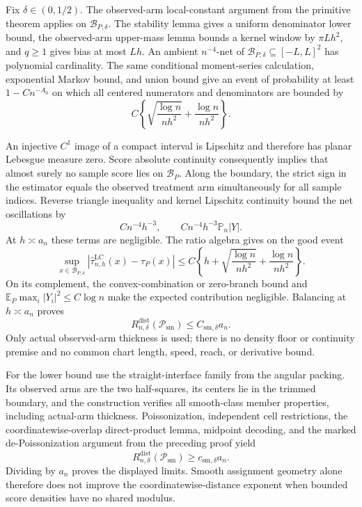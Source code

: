 Fix \(\delta\in(0,1/2)\).  The observed-arm local-constant argument from the primitive theorem applies on \(\mathcal B_{P,\delta}\).  The stability lemma gives a uniform denominator lower bound, the observed-arm upper-mass lemma bounds a kernel window by \(\pi Lh^2\), and \(q\geq1\) gives bias at most \(Lh\).  An ambient \(n^{-4}\)-net of \(\mathcal B_{P,\delta}\subseteq[-L,L]^2\) has polynomial cardinality.  The same conditional moment-series calculation, exponential Markov bound, and union bound give an event of probability at least \(1-Cn^{-A_0}\) on which all centered numerators and denominators are bounded by
\[
 C\left\{\sqrt{\frac{\log n}{nh^2}}+\frac{\log n}{nh^2}\right\}.
\]

An injective \(C^1\) image of a compact interval is Lipschitz and therefore has planar Lebesgue measure zero.  Score absolute continuity consequently implies that almost surely no sample score lies on \(\mathcal B_P\).  Along the boundary, the strict sign in the estimator equals the observed treatment arm simultaneously for all sample indices.  Reverse triangle inequality and kernel Lipschitz continuity bound the net oscillations by
\[
 Cn^{-4}h^{-3},
 \qquad Cn^{-4}h^{-3}\mathbb P_n|Y|.
\]
At \(h\asymp a_n\) these terms are negligible.  The ratio algebra gives on the good event
\[
 \sup_{x\in\mathcal B_{P,\delta}}
 |\widehat\tau^{\mathrm{LC}}_{n,h}(x)-\tau_P(x)|
 \leq C\left\{h+\sqrt{\frac{\log n}{nh^2}}+\frac{\log n}{nh^2}\right\}.
\]
On its complement, the convex-combination or zero-branch bound and \(\mathbb E_P\max_i|Y_i|^2\leq C\log n\) make the expected contribution negligible.  Balancing at \(h\asymp a_n\) proves
\[
 R_{n,\delta}^{\mathrm{dist}}(\mathcal P_{\mathrm{sm}})
 \leq C_{\mathrm{sm},\delta}a_n.
\]
Only actual observed-arm thickness is used; there is no density floor or continuity premise and no common chart length, speed, reach, or derivative bound.

For the lower bound use the straight-interface family from the angular packing.  Its observed arms are the two half-squares, its centers lie in the trimmed boundary, and the construction verifies all smooth-class member properties, including actual-arm thickness.  Poissonization, independent cell restrictions, the coordinatewise-overlap direct-product lemma, midpoint decoding, and the marked de-Poissonization argument from the preceding proof yield
\[
 R_{n,\delta}^{\mathrm{dist}}(\mathcal P_{\mathrm{sm}})
 \geq c_{\mathrm{sm},\delta}a_n.
\]
Dividing by \(a_n\) proves the displayed limits.  Smooth assignment geometry alone therefore does not improve the coordinatewise-distance exponent when bounded score densities have no shared modulus.